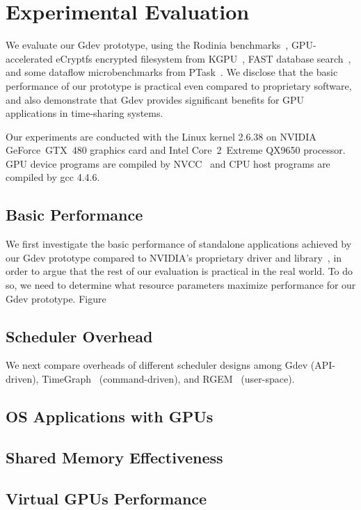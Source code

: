 \section{Experimental Evaluation}
\label{sec:evaluation}

We evaluate our Gdev prototype, using the Rodinia
benchmarks~\cite{Che_IISWC09}, GPU-accelerated eCryptfs encrypted
filesystem from KGPU~\cite{Sun_SECURITY11_Poster}, FAST database
search~\cite{Kim_SIGMOD10}, and some dataflow
microbenchmarks from PTask~\cite{Rossbach_SOSP11}.
We disclose that the basic performance of our prototype is practical
even compared to proprietary software, and also demonstrate that Gdev
provides significant benefits for GPU applications in time-sharing
systems.

Our experiments are conducted with the Linux kernel 2.6.38 on NVIDIA
GeForce~GTX~480 graphics card and Intel Core~2~Extreme QX9650 processor.
GPU device programs are compiled by NVCC~\cite{CUDA40} and CPU host
programs are compiled by gcc 4.4.6.

\subsection{Basic Performance}

We first investigate the basic performance of standalone applications achieved
by our Gdev prototype compared to NVIDIA's proprietary driver and
library~\cite{BLOB,CUDA40}, in order to argue that the rest of our
evaluation is practical in the real world. 
To do so, we need to determine what resource parameters maximize
performance for our Gdev prototype.
Figure

\subsection{Scheduler Overhead}

We next compare overheads of different scheduler designs among Gdev
(API-driven), TimeGraph~\cite{Kato_ATC11} (command-driven), and
RGEM~\cite{Kato_RTSS11} (user-space).

\subsection{OS Applications with GPUs}

\subsection{Shared Memory Effectiveness}

\subsection{Virtual GPUs Performance}